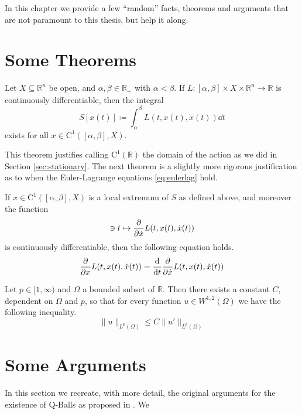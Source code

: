In this chapter we provide a few ``random'' facts, theorems and arguments that are not paramount to this thesis, but help it along.

\section{Some Theorems}\label{sec:apptheorems}
\begin{theorem}\label{th:actionexist}
Let $X\subseteq\mathbb{R}^n$ be open, and $\alpha, \beta \in\mathbb{R}_+$ with $\alpha < \beta$. If $L:[\alpha,\beta]\times X\times \mathbb{R}^n\to\mathbb{R}$ is continuously differentiable, then the integral
\begin{equation}
S[x(t)]\coloneqq\int_\alpha^\beta L(t, x(t), \dot{x}(t))\dd{t}
\end{equation}
exists for all $x\in\mathrm{C}^1([\alpha,\beta],X)$.
\end{theorem}
This theorem justifies calling $\mathrm{C}^1(\mathbb{R})$ the domain of the action as we did in Section \ref{sec:stationary}. The next theorem is a slightly more rigorous justification as to when the Euler-Lagrange equations \ref{eq:eulerlag} hold.
\begin{theorem}
If $x\in\mathrm{C}^1([\alpha,\beta],X)$ is a local extremum of $S$ as defined above, and moreover the function
\begin{equation}
[\alpha,\beta]\ni t\mapsto \pdv{\dot{x}}L(t, x(t),\dot{x}(t))
\end{equation}
is continuously differentiable, then the following equation holds.
\begin{equation}
\pdv{x}L(t, x(t),\dot{x}(t)) = \dv{t}\pdv{\dot{x}}L(t, x(t),\dot{x}(t))
\end{equation}
\end{theorem}

\begin{theorem}
Let $p\in[1,\infty)$ and $\Omega$ a bounded subset of $\mathbb{R}$. Then there exists a constant $C$, dependent on $\Omega$ and $p$, so that for every function $u\in W^{1,2}(\Omega)$ we have the following inequality.
\begin{equation}
\|u\|_{L^p(\Omega)} \leq C\|u'\|_{L^p(\Omega)}
\end{equation}
\end{theorem}


\section{Some Arguments}\label{sec:appargs}
In this section we recreate, with more detail, the original arguments for the existence of Q-Balls as proposed in \cite{coleman}. We 

